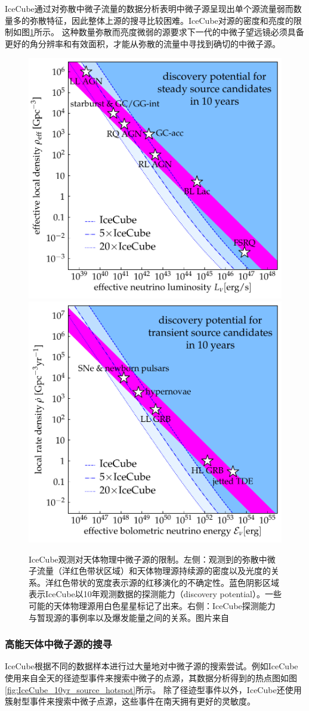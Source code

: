 IceCube通过对弥散中微子流量的数据分析表明中微子源呈现出单个源流量弱而数量多的弥散特征，因此整体上源的搜寻比较困难。IceCube对源的密度和亮度的限制如图\ref{fig:neutrino_sources}所示。
这种数量弥散而亮度微弱的源要求下一代的中微子望远镜必须具备更好的角分辨率和有效面积，才能从弥散的流量中寻找到确切的中微子源\cite{Fang_resolve_flux:2016}。

\begin{figure}[htbp]
    \centering
    \includegraphics[width=0.45\linewidth]{img/sources_steady.pdf}
    \includegraphics[width=0.45\linewidth]{img/sources_transient.pdf}
    \caption{IceCube观测对天体物理中微子源的限制。左侧：观测到的弥散中微子流量（洋红色带状区域）和天体物理源持续源的密度以及光度的关系。洋红色带状的宽度表示源的红移演化的不确定性。蓝色阴影区域表示IceCube以10年观测数据的探测能力（discovery potential）。一些可能的天体物理源用白色星星标记了出来。右侧：IceCube探测能力与暂现源的事例率以及爆发能量之间的关系。图片来自\parencite{Astro2020_neutrino}}
    \label{fig:neutrino_sources}
\end{figure}

\subsubsection{高能天体中微子源的搜寻}

IceCube根据不同的数据样本进行过大量地对中微子源的搜索尝试。例如IceCube使用来自全天的径迹型事件来搜索中微子的点源\cite{IceCube_10yr_point_source:2019}，其数据分析得到的热点图如图\ref{fig:IceCube_10yr_source_hotspot}所示。
除了径迹型事件以外，IceCube还使用簇射型事件来搜索中微子点源\cite{IceCube_7yr_cascade_source:2019}，这些事件在南天拥有更好的灵敏度。


